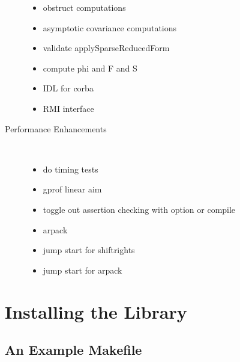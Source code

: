 \documentclass[12pt]{article}
\begin{document}
\begin{description}
\begin{itemize}
\item obstruct computations
\item asymptotic covariance computations
\item validate applySparseReducedForm
\item compute phi and F and S
\item IDL for corba
\item RMI interface
  \end{itemize}
\item[Performance Enhancements] \ 
  \begin{itemize}
\item do timing tests 
\item gprof linear aim
\item toggle out assertion checking with option or compile
\item arpack
\item jump start for shiftrights
\item jump start for arpack
  \end{itemize}
\end{description}
\section{Installing the Library}

\subsection{An Example Makefile}
\label{sec:examplelibmake}
\end{document}
